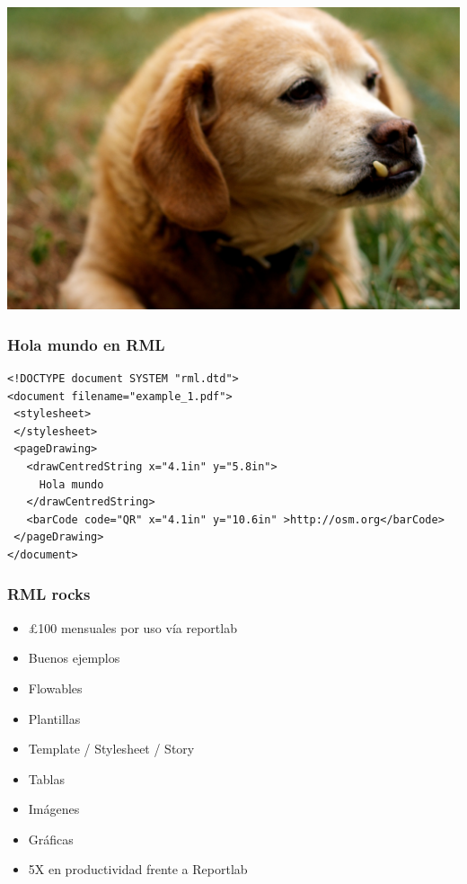 \documentclass[8pt,xcolor={usenames,dvipsnames}]{beamer}
\begin{document}
\begin{frame}

\includegraphics[width=\paperwidth]{images/uglyxml.jpg}

\end{frame}

\begin{frame}[fragile]
\frametitle{Hola mundo en RML}
\begin{verbatim}
<!DOCTYPE document SYSTEM "rml.dtd">
<document filename="example_1.pdf">
 <stylesheet>
 </stylesheet>
 <pageDrawing>
   <drawCentredString x="4.1in" y="5.8in">
     Hola mundo
   </drawCentredString>
   <barCode code="QR" x="4.1in" y="10.6in" >http://osm.org</barCode>
 </pageDrawing>
</document>
\end{verbatim}

\end{frame}

\begin{frame}
\frametitle{RML rocks}
\begin{itemize}
\item \pounds 100 mensuales por uso vía reportlab
\item Buenos ejemplos
\item Flowables
\item Plantillas
\item Template / Stylesheet / Story
\item Tablas
\item Imágenes
\item Gráficas
\item 5X en productividad frente a Reportlab
\end{itemize}
\end{frame}
\end{document}

